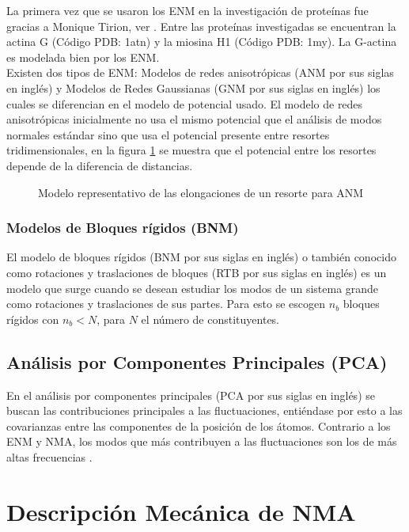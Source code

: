 La primera vez que se usaron los ENM en la investigaci\'{o}n de prote\'{i}nas fue gracias a Monique Tirion, ver \cite{Tirion1996}. Entre las prote\'{i}nas  investigadas se encuentran la actina G (C\'{o}digo PDB: 1atn) y la miosina H1 (C\'{o}digo PDB: 1my). La G-actina es modelada bien por los ENM.\\ 

Existen dos tipos de ENM: Modelos de redes anisotr\'{o}picas (ANM por sus siglas en ingl\'{e}s) y Modelos de Redes Gaussianas (GNM por sus siglas en ingl\'{e}s) los cuales se diferencian en el modelo de potencial usado.  El modelo de redes anisotr\'{o}picas inicialmente no usa el mismo potencial que el an\'{a}lisis de modos normales est\'{a}ndar sino que usa el potencial presente entre resortes tridimensionales, en la figura \ref{fig:ANM} se muestra que el potencial entre los resortes depende de la diferencia de distancias.\\
\begin{figure}
\centering
%
\caption{Modelo representativo de las elongaciones de un resorte para ANM} \label{fig:ANM}
\end{figure}
\subsubsection{Modelos de Bloques r\'{i}gidos (BNM)}
El modelo de bloques r\'{i}gidos (BNM por sus siglas en ingl\'{e}s) o tambi\'{e}n conocido como rotaciones y traslaciones de bloques (RTB por sus siglas en ingl\'{e}s) es un modelo que surge cuando se desean estudiar  los modos de un sistema grande como rotaciones y traslaciones de sus partes. Para esto se escogen $n_b$ bloques r\'{i}gidos con $n_b<N$, para $N$ el n\'{u}mero de constituyentes.\\

\subsection{An\'{a}lisis por Componentes Principales (PCA)}
En el an\'{a}lisis por componentes principales (PCA por sus siglas en ingl\'{e}s) se buscan las contribuciones principales a las fluctuaciones, enti\'{e}ndase por esto a las covarianzas entre las componentes de la posici\'{o}n de los \'{a}tomos. Contrario a los ENM y NMA, los modos que m\'{a}s contribuyen a las fluctuaciones son los de m\'{a}s altas frecuencias \cite{Amadei1993}.
\section{Descripci\'{o}n Mec\'{a}nica de NMA}\label{sec:MecNMA}

